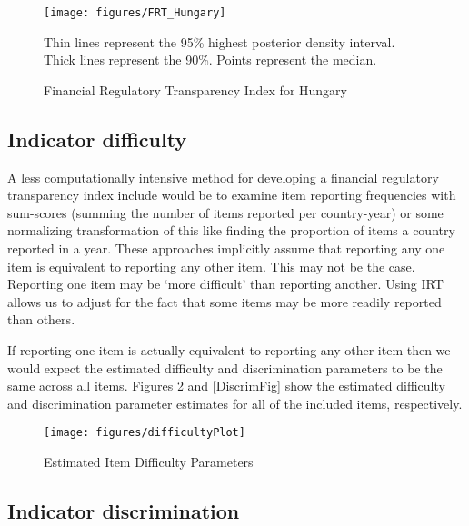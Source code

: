 \documentclass[a4paper]{article}
\begin{document}

\begin{figure}
    \caption{Financial Regulatory Transparency Index for Hungary}
    \label{FRTHungary}
    \begin{center}
        \texttt{[image: figures/FRT\_Hungary]}
    \end{center}
    {\scriptsize{Thin lines represent the 95\% highest posterior density interval. Thick lines represent the 90\%. Points represent the median.}}
\end{figure}

\subsection{Indicator difficulty}

A less computationally intensive method for developing a financial regulatory transparency index include would be to examine item reporting frequencies with sum-scores (summing the number of items reported per country-year) or some normalizing transformation of this like finding the proportion of items a country reported in a year. These approaches implicitly assume that reporting any one item is equivalent to reporting any other item. This may not be the case. Reporting one item may be `more difficult' than reporting another. Using IRT allows us to adjust for the fact that some items may be more readily reported than others. 

If reporting one item is actually equivalent to reporting any other item then we would expect the estimated difficulty and discrimination parameters to be the same across all items. Figures \ref{DifficultyFig} and \ref{DiscrimFig} show the estimated difficulty and discrimination parameter estimates for all of the included items, respectively.    


\begin{figure}
    \caption{Estimated Item Difficulty Parameters}
    \label{DifficultyFig}
    \begin{center}
        \texttt{[image: figures/difficultyPlot]}
    \end{center}
\end{figure}


\subsection{Indicator discrimination}
\end{document}
